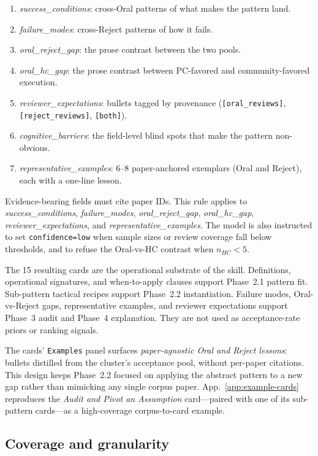 \documentclass[10pt,a4paper]{article}
\begin{document}
\begin{enumerate}[nosep, leftmargin=1.5em]
\item \emph{success\_conditions}: cross-Oral patterns of what makes the pattern land.
\item \emph{failure\_modes}: cross-Reject patterns of how it fails.
\item \emph{oral\_reject\_gap}: the prose contrast between the two pools.
\item \emph{oral\_hc\_gap}: the prose contrast between PC-favored and community-favored execution.
\item \emph{reviewer\_expectations}: bullets tagged by provenance (\texttt{[oral\_reviews]}, \texttt{[reject\_reviews]}, \texttt{[both]}).
\item \emph{cognitive\_barriers}: the field-level blind spots that make the pattern non-obvious.
\item \emph{representative\_examples}: 6--8 paper-anchored exemplars (Oral and Reject), each with a one-line lesson.
\end{enumerate}

Evidence-bearing fields must cite paper IDs. This rule applies to \emph{success\_conditions}, \emph{failure\_modes}, \emph{oral\_reject\_gap}, \emph{oral\_hc\_gap}, \emph{reviewer\_expectations}, and \emph{representative\_examples}. The model is also instructed to set \texttt{confidence=low} when sample sizes or review coverage fall below thresholds, and to refuse the Oral-vs-HC contrast when \(n_{HC}<5\).

The 15 resulting cards are the operational substrate of the skill. Definitions, operational signatures, and when-to-apply clauses support Phase~2.1 pattern fit. Sub-pattern tactical recipes support Phase~2.2 instantiation. Failure modes, Oral-vs-Reject gaps, representative examples, and reviewer expectations support Phase~3 audit and Phase~4 explanation. They are not used as acceptance-rate priors or ranking signals.

The cards' \texttt{Examples} panel surfaces \emph{paper-agnostic Oral and Reject lessons}: bullets distilled from the cluster's acceptance pool, without per-paper citations. This design keeps Phase~2.2 focused on applying the abstract pattern to a new gap rather than mimicking any single corpus paper. App.~\ref{app:example-cards} reproduces the \emph{Audit and Pivot an Assumption} card---paired with one of its sub-pattern cards---as a high-coverage corpus-to-card example.

\subsection{Coverage and granularity}
\end{document}
